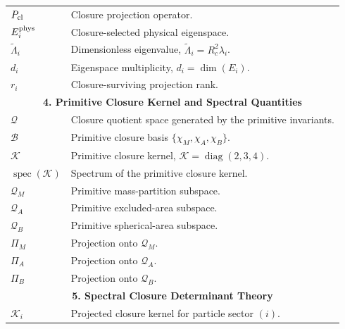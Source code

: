 \documentclass[11pt]{article}
\theoremstyle{definition}
\theoremstyle{remark}
\begin{document}
\begin{longtable}{p{}p{}}
$P_{\rm cl}$ & Closure projection operator. \\

$E_i^{\rm phys}$ & Closure-selected physical eigenspace. \\

$\widetilde{\Lambda}_i$ & Dimensionless eigenvalue, $\widetilde{\Lambda}_i=R_c^2\lambda_i$. \\

$d_i$ & Eigenspace multiplicity, $d_i=\dim(E_i)$. \\

$r_i$ & Closure-surviving projection rank. \\

\hline
\multicolumn{2}{c}{\textbf{4. Primitive Closure Kernel and Spectral Quantities}} \\
\hline

$\mathcal Q$ & Closure quotient space generated by the primitive invariants. \\

$\mathcal B$ & Primitive closure basis $\{\chi_M,\chi_A,\chi_B\}$. \\

$\mathcal K$ & Primitive closure kernel, $\mathcal K=\operatorname{diag}(2,3,4)$. \\

$\operatorname{spec}(\mathcal K)$ & Spectrum of the primitive closure kernel. \\

$\mathcal Q_M$ & Primitive mass-partition subspace. \\

$\mathcal Q_A$ & Primitive excluded-area subspace. \\

$\mathcal Q_B$ & Primitive spherical-area subspace. \\

$\Pi_M$ & Projection onto $\mathcal Q_M$. \\

$\Pi_A$ & Projection onto $\mathcal Q_A$. \\

$\Pi_B$ & Projection onto $\mathcal Q_B$. \\

\hline
\multicolumn{2}{c}{\textbf{5. Spectral Closure Determinant Theory}} \\
\hline

$\mathcal K_i$ & Projected closure kernel for particle sector $(i)$. \\


\end{longtable}
\end{document}
